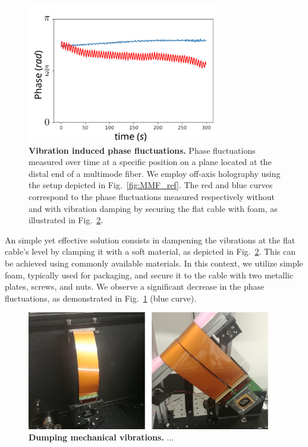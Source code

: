 \documentclass[12pt]{iopart}
\begin{document}
\begin{figure}[ht]
  \centering
  \includegraphics[width = 0.75\textwidth]{images/phase_vibrations.pdf}
  \caption{
    \textbf{Vibration induced phase fluctuations.}
    Phase fluctuations measured over time at
    a specific position on a plane located at the distal end of a multimode fiber.
    We employ off-axis holography using the setup depicted in Fig.~\ref{fig:MMF_ref}.
    The red and blue curves correspond to the phase fluctuations
    measured respectively without and with vibration damping
    by securing the flat cable with foam, as illustrated in Fig.~\ref{fig:dumping}.
  }
  \label{fig:phase_vibrations}
\end{figure}


An simple yet effective solution consists in dampening the vibrations
at the flat cable's level by clamping it with a soft material,
as depicted in Fig.~\ref{fig:dumping}.
This can be achieved using commonly available materials.
In this context, we utilize simple foam, typically used for packaging, and secure it to the cable
with two metallic plates, screws, and nuts.
We observe a significant decrease in the phase fluctuations,
as demonstrated in Fig.~\ref{fig:phase_vibrations} (blue curve).\\



\begin{figure}[ht]
  \centering
  \includegraphics[width = 0.95\textwidth]{images/dumping.pdf}
  \caption{
    \textbf{Dumping mechanical vibrations.}
    ...
    \label{fig:dumping}
  }
  \label{fig:dumping}
\end{figure}
\end{document}
